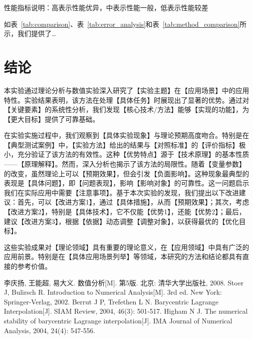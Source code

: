 \documentclass{joulabreport}
\begin{document}
{\begin{table}[h]
\begin{tabular}{
    l
    >{\raggedright\arraybackslash}p{4cm}
    >{\raggedright\arraybackslash}p{3cm}
    >{\centering\arraybackslash}p{2cm}
    >{\centering\arraybackslash}p{2cm}
}
\bottomrule
\end{tabular}
\begin{tablenotes}
\small
\item 性能指标说明：高表示性能优异，中表示性能一般，低表示性能较差
\end{tablenotes}
\end{table}
\FloatBarrier

如表~\ref{tab:comparison}、表~\ref{tab:error_analysis}和表~\ref{tab:method_comparison}所示，我们提供了\dots

\section{结论}
本实验通过理论分析与数值实验深入研究了【实验主题】在【应用场景】中的应用特性。实验结果表明，该方法在处理【具体任务】时展现出了显著的优势。通过对【关键要素】的系统性分析，我们发现【核心技术/方法】能够【实现的功能】，为【更大目标】提供了可靠基础。

在实验实施过程中，我们观察到【具体实验现象】与理论预期高度吻合。特别是在【典型测试案例】中，【实验方法】给出的结果与【对照标准】的【评价指标】极小，充分验证了该方法的有效性。这种【优势特点】源于【技术原理】的基本性质——【原理解释】。然而，深入分析也揭示了该方法的局限性。随着【变量参数】的改变，虽然理论上可以【预期效果】，但会引发【负面影响】。这种现象最典型的表现是【具体问题】，即【问题表现】，影响【影响对象】的可靠性。这一问题启示我们在实际应用中需要【注意事项】。基于本次实验的发现，我们提出以下改进建议：首先，可以【改进方案1】，通过【具体措施】，从而【预期效果】；其次，考虑【改进方案2】，特别是【具体技术】，它不仅能【优势1】，还能【优势2】；最后，建议【改进方案3】，根据【依据】动态调整【调整对象】，以获得最优的【优化目标】。

这些实验成果对【理论领域】具有重要的理论意义，在【应用领域】中具有广泛的应用前景。特别是在【具体应用场景列举】等领域，本研究的方法和结论都具有直接的参考价值。

\begin{thebibliography}{4}
 李庆扬, 王能超, 易大义. 数值分析[M]. 第5版. 北京: 清华大学出版社, 2008.
 Stoer J, Bulirsch R. Introduction to Numerical Analysis[M]. 3rd ed. New York: Springer-Verlag, 2002.
 Berrut J P, Trefethen L N. Barycentric Lagrange Interpolation[J]. SIAM Review, 2004, 46(3): 501-517.
 Higham N J. The numerical stability of barycentric Lagrange interpolation[J]. IMA Journal of Numerical Analysis, 2004, 24(4): 547-556.
\end{thebibliography}

} %
\end{document}
